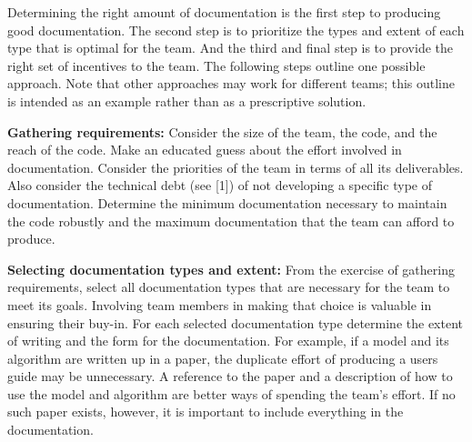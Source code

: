 \documentclass[]{article}
\date{}
\begin{document}
\pagestyle{fancy}
\renewcommand{\headrulewidth}{0pt}
  
\thispagestyle{empty}
\textbf{\newline}


Determining the right amount of documentation is the first step to
producing good documentation. The second step is to prioritize the types
and extent of each type that is optimal for the team. And the third and
final step is to provide the right set of incentives to the team. The
following steps outline one possible approach. Note that other
approaches may work for different teams; this outline is intended as an
example rather than as a prescriptive solution.

\textbf{Gathering requirements:} Consider
the size of the team, the code, and the reach of the code. Make an
educated guess about the effort involved in documentation. Consider the
priorities of the team in terms of all its deliverables. Also consider
the technical debt (see {[}1{]}) of not developing a specific type of
documentation. Determine the minimum documentation necessary to maintain
the code robustly and the maximum documentation that the team can afford
to produce.

\textbf{Selecting documentation types and
extent:} From the exercise of gathering requirements, select all
documentation types that are necessary for the team to meet its goals.
Involving team members in making that choice is valuable in ensuring
their buy-in. For each selected documentation type determine the extent
of writing and the form for the documentation. For example, if a model
and its algorithm are written up in a paper, the duplicate effort of
producing a users guide may be unnecessary. A reference to the paper and
a description of how to use the model and algorithm are better ways of
spending the team's effort. If no such paper exists, however, it is
important to include everything in the documentation.
\end{document}
